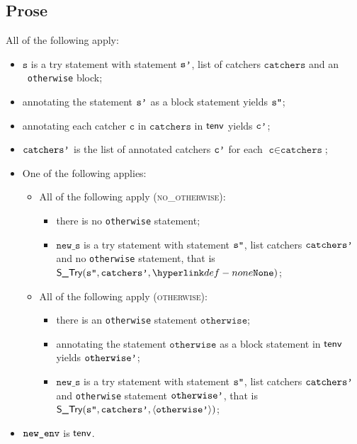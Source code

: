 \documentclass{book}
\newcommand\ProseOrTypeError[0]{\ProseTerminateAs{\TypeErrorConfig}}
\newcommand\vc[0]{\texttt{c}}
\newcommand\vs[0]{\texttt{s}}
\newcommand\news[0]{\texttt{new\_s}}
\newcommand\catchers[0]{\texttt{catchers}}
\newcommand\otherwise[0]{\texttt{otherwise}}
\begin{document}
\subsection{Prose}
All of the following apply:
\begin{itemize}
  \item $\vs$ is a try statement with statement $\texttt{s'}$, list of catchers $\catchers$ and an \optional\ \texttt{otherwise} block;
  \item annotating the statement $\texttt{s'}$ as a block statement yields $\texttt{s''}$\ProseOrTypeError;
  \item annotating each catcher $\vc$ in $\catchers$ in $\textsf{tenv}$ yields $\texttt{c'}$\ProseOrTypeError;
  \item $\texttt{catchers'}$ is the list of annotated catchers $\texttt{c'}$ for each $\vc\in\catchers$;
  \item One of the following applies:
  \begin{itemize}
    \item All of the following apply (\textsc{no\_otherwise}):
    \begin{itemize}
      \item there is no \texttt{otherwise} statement;
      \item $\news$ is a try statement with statement $\texttt{s''}$, list catchers $\texttt{catchers'}$ and no \texttt{otherwise} statement,
            that is \\
            $\STry(\vspp, \catchersp, \None)$;
    \end{itemize}

    \item All of the following apply (\textsc{otherwise}):
    \begin{itemize}
      \item there is an \texttt{otherwise} statement $\otherwise$;
      \item annotating the statement $\otherwise$ as a block statement in $\textsf{tenv}$ yields $\texttt{otherwise'}$\ProseOrTypeError;
      \item $\news$ is a try statement with statement $\texttt{s''}$, list catchers $\texttt{catchers'}$ and \texttt{otherwise} statement
            $\texttt{otherwise'}$, that is \\
            $\textsf{S\_Try}(\texttt{s''}, \texttt{catchers'}, \langle\texttt{otherwise'}\rangle)$;
    \end{itemize}
  \end{itemize}
  \item $\texttt{new\_env}$ is $\textsf{tenv}$.
\end{itemize}
\end{document}
